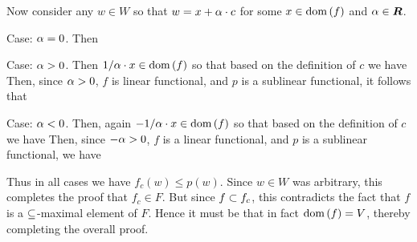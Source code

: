 \begin{questions}
{{      Now consider any $w \in W$ so that $w = x + \a \cdot c$ for some $x \in \dom(f)$ and $\a \in \reals$.

      Case: $\a = 0$.
      Then

      Case: $\a > 0$.
      Then $1/\a \cdot x \in \dom(f)$ so that based on the definition of $c$ we have
      Then, since $\a > 0$, $f$ is linear functional, and $p$ is a sublinear functional, it follows that

      Case: $\a < 0$.
      Then, again $-1/\a \cdot x \in \dom(f)$ so that based on the definition of $c$ we have
      Then, since $-\a > 0$, $f$ is a linear functional, and $p$ is a sublinear functional, we have

      Thus in all cases we have $f_c(w) \leq p(w)$.
      Since $w \in W$ was arbitrary, this completes the proof that $f_c \in F$.
      But since $f \pss f_c$, this contradicts the fact that $f$ is a $\ss$-maximal element of $F$.
      Hence it must be that in fact $\dom(f) = V$, thereby completing the overall proof.
    }
  }


\end{questions}
